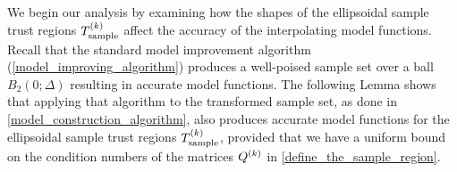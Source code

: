 \documentclass{article}
\begin{document}
%


We begin our analysis by examining how the shapes of the ellipsoidal sample trust regions ${T_{\text{sample}}^{(k)}}$ affect the accuracy of the interpolating model functions.
Recall that the standard model improvement algorithm (\cref{model_improving_algorithm}) produces a well-poised sample set over a ball $B_2(0;\Delta)$ resulting in accurate model functions.
The following Lemma shows that applying that algorithm to the transformed sample set, as done in \cref{model_construction_algorithm},  also produces accurate model functions for the ellipsoidal sample trust regions ${T_{\text{sample}}^{(k)}}$,  provided that we have a uniform bound on the condition numbers of the matrices ${Q^{(k)}}$ in \cref{define_the_sample_region}.
\end{document}
